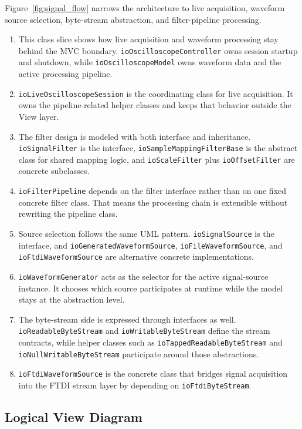 Figure~\ref{fig:signal_flow} narrows the architecture to live acquisition, waveform source selection, byte-stream abstraction, and filter-pipeline processing.

\begin{enumerate}
    \item This class slice shows how live acquisition and waveform processing stay behind the MVC boundary. \texttt{ioOscilloscopeController} owns session startup and shutdown, while \texttt{ioOscilloscopeModel} owns waveform data and the active processing pipeline.
    \item \texttt{ioLiveOscilloscopeSession} is the coordinating class for live acquisition. It owns the pipeline-related helper classes and keeps that behavior outside the View layer.
    \item The filter design is modeled with both interface and inheritance. \texttt{ioSignalFilter} is the interface, \texttt{ioSampleMappingFilterBase} is the abstract class for shared mapping logic, and \texttt{ioScaleFilter} plus \texttt{ioOffsetFilter} are concrete subclasses.
    \item \texttt{ioFilterPipeline} depends on the filter interface rather than on one fixed concrete filter class. That means the processing chain is extensible without rewriting the pipeline class.
    \item Source selection follows the same UML pattern. \texttt{ioSignalSource} is the interface, and \texttt{ioGeneratedWaveformSource}, \texttt{ioFileWaveformSource}, and \texttt{ioFtdiWaveformSource} are alternative concrete implementations.
    \item \texttt{ioWaveformGenerator} acts as the selector for the active signal-source instance. It chooses which source participates at runtime while the model stays at the abstraction level.
    \item The byte-stream side is expressed through interfaces as well. \texttt{ioReadableByteStream} and \texttt{ioWritableByteStream} define the stream contracts, while helper classes such as \texttt{ioTappedReadableByteStream} and \texttt{ioNullWritableByteStream} participate around those abstractions.
    \item \texttt{ioFtdiWaveformSource} is the concrete class that bridges signal acquisition into the FTDI stream layer by depending on \texttt{ioFtdiByteStream}.
\end{enumerate}

\subsection{Logical View Diagram}
\label{Section::Logical View Diagram}

